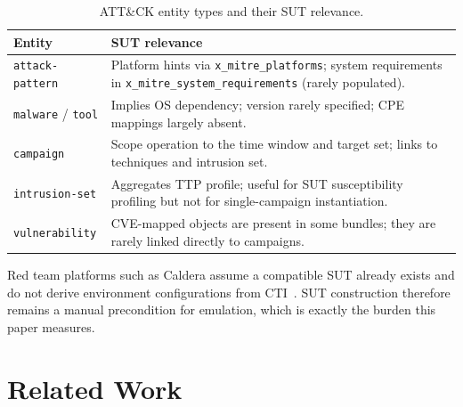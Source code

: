 \documentclass[sigconf]{acmart}
\newcommand{\caldera}{Caldera\xspace}
\begin{document}
\begin{table}[!htb]
\caption{ATT\&CK entity types and their SUT relevance.}\label{tab:entities}
\centering\small
\begin{tabular}{>{\raggedright\arraybackslash}p{2.0cm} >{\raggedright\arraybackslash}p{5.6cm}}
\toprule
\textbf{Entity} & \textbf{SUT relevance} \\
\midrule
\texttt{attack-pattern} &
  Platform hints via \texttt{x\_mitre\_platforms}; system requirements in \texttt{x\_mitre\_system\_requirements} (rarely populated). \\
\texttt{malware} / \texttt{tool} &
  Implies OS dependency; version rarely specified; CPE mappings largely absent. \\
\texttt{campaign} &
  Scope operation to the time window and target set; links to techniques and intrusion set. \\
\texttt{intrusion-set} &
  Aggregates TTP profile; useful for SUT susceptibility profiling but not for single-campaign instantiation. \\
\texttt{vulnerability} &
  CVE-mapped objects are present in some bundles; they are rarely linked directly to campaigns. \\
\bottomrule
\end{tabular}
\end{table}

Red team platforms such as \caldera{} assume a compatible SUT already exists and do not derive environment configurations from CTI~\cite{applebaum2016caldera}. SUT construction therefore remains a manual precondition for emulation, which is exactly the burden this paper measures.


\section{Related Work}\label{sec:related}
\end{document}
